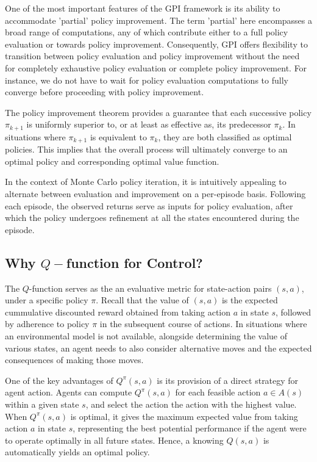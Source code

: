 One of the most important features of the GPI framework is its ability to accommodate 'partial' policy improvement. The term 'partial' here encompasses a broad range of computations, any of which contribute either to a full policy evaluation or towards policy improvement. Consequently, GPI offers flexibility to transition between policy evaluation and policy improvement without the need for completely exhaustive policy evaluation or complete policy improvement. For instance, we do not have to wait for policy evaluation computations to fully converge before proceeding with policy improvement.


The policy improvement theorem provides a guarantee that each successive policy $\pi_{k+1}$ is uniformly superior to, or at least as effective as, its predecessor $\pi_{k}$. In situations where $\pi_{k+1}$ is equivalent  to $\pi_{k}$, they are both classified as optimal policies. This implies that the overall process will ultimately converge to an optimal policy and corresponding optimal value function. 

In the context of Monte Carlo policy iteration, it is intuitively appealing to alternate between evaluation and improvement on a per-episode basis. Following each episode, the observed returns serve as inputs for policy evaluation, after which the policy undergoes refinement at all the states encountered during the episode.

\subsection{Why $Q-$function for Control?}

The $Q$-function serves as the an evaluative metric for state-action pairs $(s,a)$, under a specific policy $\pi$. Recall that the value of $(s,a)$ is the expected cummulative discounted reward obtained from taking action $a$ in state $s$, followed by adherence to policy $\pi$ in the subsequent course of actions.
In situations where an environmental model is not available, alongside determining the value of various states, an agent needs to also consider alternative moves and the expected consequences of making those moves. 

One of the key advantages of $Q^{\pi}(s,a)$ is its provision of a direct strategy for agent action. 
Agents can compute $Q^{\pi}(s,a)$ for each feasible action $a \in A(s)$ within a given state $s$, and select the action the action with the highest value.
When $Q^{\pi}(s,a)$ is optimal, it gives the maximum expected value from taking action $a$ in state $s$, representing the best potential performance if the agent were to operate optimally in all future states. Hence, a knowing $Q(s,a)$ is automatically yields an optimal policy.

